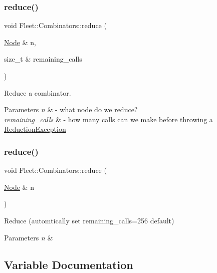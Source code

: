 \subsubsection{\texorpdfstring{reduce()}{reduce()}\hspace{0.1cm}{\footnotesize\ttfamily [1/2]}}
{\footnotesize\ttfamily void Fleet\+::\+Combinators\+::reduce (\begin{DoxyParamCaption}\item[{\hyperlink{class_node}{Node} \&}]{n,  }\item[{size\+\_\+t \&}]{remaining\+\_\+calls }\end{DoxyParamCaption})}



Reduce a combinator. 


\begin{DoxyParams}{Parameters}
{\em n} & -\/ what node do we reduce? \\
\hline
{\em remaining\+\_\+calls} & -\/ how many calls can we make before throwing a \hyperlink{class_fleet_1_1_combinators_1_1_reduction_exception}{Reduction\+Exception} \\
\hline
\end{DoxyParams}
\mbox{\label{namespace_fleet_1_1_combinators_ac1c41f1db65aa51fdeac1a4016b8212c}} 
\subsubsection{\texorpdfstring{reduce()}{reduce()}\hspace{0.1cm}{\footnotesize\ttfamily [2/2]}}
{\footnotesize\ttfamily void Fleet\+::\+Combinators\+::reduce (\begin{DoxyParamCaption}\item[{\hyperlink{class_node}{Node} \&}]{n }\end{DoxyParamCaption})}



Reduce (automtically set remaining\+\_\+calls=256 default) 


\begin{DoxyParams}{Parameters}
{\em n} & \\
\hline
\end{DoxyParams}


\subsection{Variable Documentation}
\mbox{\label{namespace_fleet_1_1_combinators_a837dab8d754d0f5062bf633738832079}} 
